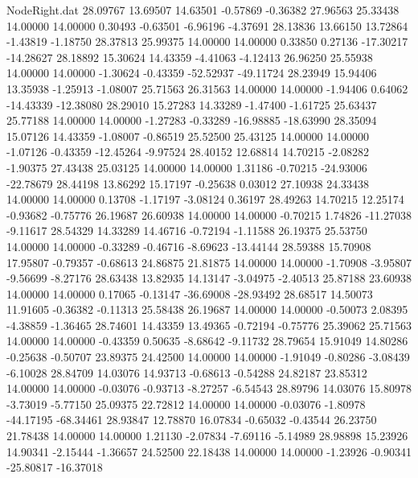 \begin{filecontents}{NodeRight.dat}
  28.09767   13.69507   14.63501    -0.57869   -0.36382   27.96563   25.33438   14.00000   14.00000    0.30493   -0.63501   -6.96196   -4.37691
  28.13836   13.66150   13.72864    -1.43819   -1.18750   28.37813   25.99375   14.00000   14.00000    0.33850    0.27136  -17.30217  -14.28627
  28.18892   15.30624   14.43359    -4.41063   -4.12413   26.96250   25.55938   14.00000   14.00000   -1.30624   -0.43359  -52.52937  -49.11724
  28.23949   15.94406   13.35938    -1.25913   -1.08007   25.71563   26.31563   14.00000   14.00000   -1.94406    0.64062  -14.43339  -12.38080
  28.29010   15.27283   14.33289    -1.47400   -1.61725   25.63437   25.77188   14.00000   14.00000   -1.27283   -0.33289  -16.98885  -18.63990
  28.35094   15.07126   14.43359    -1.08007   -0.86519   25.52500   25.43125   14.00000   14.00000   -1.07126   -0.43359  -12.45264   -9.97524
  28.40152   12.68814   14.70215    -2.08282   -1.90375   27.43438   25.03125   14.00000   14.00000    1.31186   -0.70215  -24.93006  -22.78679
  28.44198   13.86292   15.17197    -0.25638    0.03012   27.10938   24.33438   14.00000   14.00000    0.13708   -1.17197   -3.08124    0.36197
  28.49263   14.70215   12.25174    -0.93682   -0.75776   26.19687   26.60938   14.00000   14.00000   -0.70215    1.74826  -11.27038   -9.11617
  28.54329   14.33289   14.46716    -0.72194   -1.11588   26.19375   25.53750   14.00000   14.00000   -0.33289   -0.46716   -8.69623  -13.44144
  28.59388   15.70908   17.95807    -0.79357   -0.68613   24.86875   21.81875   14.00000   14.00000   -1.70908   -3.95807   -9.56699   -8.27176
  28.63438   13.82935   14.13147    -3.04975   -2.40513   25.87188   23.60938   14.00000   14.00000    0.17065   -0.13147  -36.69008  -28.93492
  28.68517   14.50073   11.91605    -0.36382   -0.11313   25.58438   26.19687   14.00000   14.00000   -0.50073    2.08395   -4.38859   -1.36465
  28.74601   14.43359   13.49365    -0.72194   -0.75776   25.39062   25.71563   14.00000   14.00000   -0.43359    0.50635   -8.68642   -9.11732
  28.79654   15.91049   14.80286    -0.25638   -0.50707   23.89375   24.42500   14.00000   14.00000   -1.91049   -0.80286   -3.08439   -6.10028
  28.84709   14.03076   14.93713    -0.68613   -0.54288   24.82187   23.85312   14.00000   14.00000   -0.03076   -0.93713   -8.27257   -6.54543
  28.89796   14.03076   15.80978    -3.73019   -5.77150   25.09375   22.72812   14.00000   14.00000   -0.03076   -1.80978  -44.17195  -68.34461
  28.93847   12.78870   16.07834    -0.65032   -0.43544   26.23750   21.78438   14.00000   14.00000    1.21130   -2.07834   -7.69116   -5.14989
  28.98898   15.23926   14.90341    -2.15444   -1.36657   24.52500   22.18438   14.00000   14.00000   -1.23926   -0.90341  -25.80817  -16.37018

\end{filecontents}
